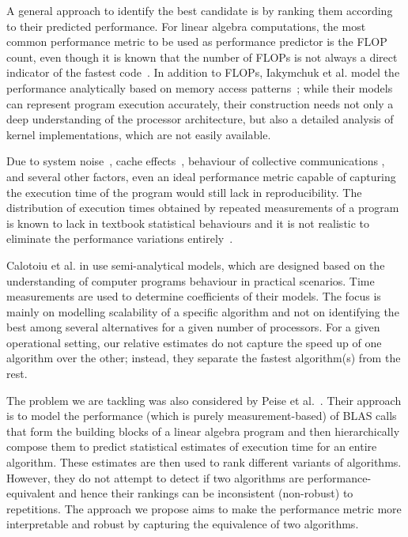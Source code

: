 \documentclass[conference]{IEEEtran}
\begin{document}
A general approach to identify the best candidate is by ranking them according to their predicted performance.
For linear algebra computations, the
most common performance metric to be used as performance predictor is the FLOP count, even though it is known that the
number of FLOPs is not always a direct indicator of the fastest code~\cite{barthels2019linnea}. In addition to FLOPs,
Iakymchuk et al. model the performance analytically based on memory access
patterns~\cite{iakymchuk2012modeling,iakymchuk2011execution}; while their models can represent program execution
accurately, their construction needs not only a deep understanding of the processor architecture, but also a detailed analysis of kernel implementations, which are not easily available.

Due to system noise~\cite{hoefler2010characterizing}, cache effects~\cite{peise2014cache}, behaviour of
collective communications \cite{agarwal2005impact}, and several other factors, 
even an ideal performance metric capable of capturing the execution time of the program would still lack in
reproducibility. The distribution of execution times obtained by repeated measurements of a program is known to lack in textbook statistical behaviours and it is not realistic to eliminate the performance variations entirely~\cite{robustbenchmarking,trackingPerfVariation,statiscalperfCompare}. 

Calotoiu et al. in \cite{calotoiu2013} use semi-analytical models, which are designed based on the understanding of
computer programs behaviour in practical scenarios. Time measurements are used to determine coefficients of their
models. The focus is mainly on modelling scalability of a specific algorithm and not on identifying the best among
several alternatives for a given number of processors. For a given operational setting, our relative estimates do not
capture the speed up of one algorithm over the other; instead, they separate the fastest algorithm(s) from the rest.

The problem we are tackling was also considered by Peise et al.~\cite{peise2012performance}.
Their approach is to model the performance (which is purely measurement-based) of BLAS calls that form the building blocks of
a linear algebra program and then hierarchically compose them to predict statistical estimates of execution time for an
entire algorithm. These estimates are then used to rank different variants of algorithms. However, they do not attempt
to detect if two algorithms are performance-equivalent and hence their rankings can be inconsistent (non-robust) to
repetitions. The approach we propose aims to make the performance metric more interpretable and robust by capturing the equivalence of two algorithms.  
\end{document}
